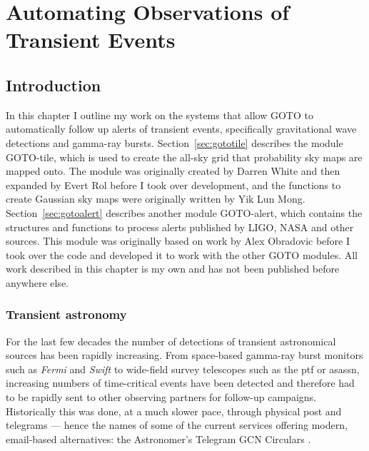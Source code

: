 \chapter{Automating Observations of Transient Events}
\label{chap:events}
\chaptoc{}


\newpage
\section{Introduction}
\label{sec:events_intro}
\begin{colsection}


\begin{colsection}

In this chapter I outline my work on the systems that allow GOTO to automatically follow up alerts of transient events, specifically gravitational wave detections and gamma-ray bursts. Section~\ref{sec:gototile} describes the  module GOTO-tile, which is used to create the all-sky grid that probability sky maps are mapped onto. The module was originally created by Darren White and then expanded by Evert Rol before I took over development, and the functions to create Gaussian sky maps were originally written by Yik Lun Mong. Section~\ref{sec:gotoalert} describes another  module GOTO-alert, which contains the structures and functions to process alerts published by LIGO, NASA and other sources. This module was originally based on work by Alex Obradovic before I took over the code and developed it to work with the other GOTO modules. All work described in this chapter is my own and has not been published before anywhere else.

\end{colsection}


\subsection{Transient astronomy}
\label{sec:transient_astronomy}
\begin{colsection}

For the last few decades the number of detections of transient astronomical sources has been rapidly increasing. From space-based gamma-ray burst monitors such as \textit{Fermi} and \textit{Swift} to wide-field survey telescopes such as the \gls{ptf} or \gls{asassn}, increasing numbers of time-critical events have been detected and therefore had to be rapidly sent to other observing partners for follow-up campaigns. Historically this was done, at a much slower pace, through physical post and telegrams --- hence the names of some of the current services offering modern, email-based alternatives: the Astronomer's Telegram \citep{ATel} GCN Circulars \citep{GCN}.


\end{colsection}
\end{colsection}
